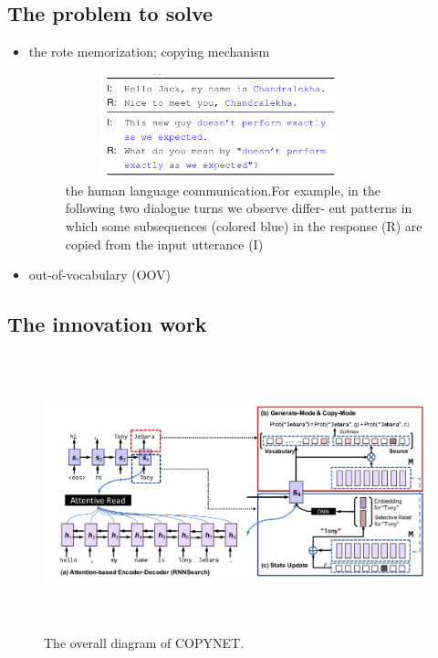 \documentclass[UTF8]{ctexart}
\begin{document}
    \subsection{The problem to solve}
    \begin{itemize}
    \item the rote memorization; copying mechanism

    \begin{figure}[htbp]
        \centering
        \includegraphics[width=9cm,height=3cm]{pictures/lr.jpg}
        \caption{the human language communication.For example, in the
        following two dialogue turns we observe differ-
        ent patterns in which some subsequences (colored
        blue) in the response (R) are copied from the input
        utterance (I)}
      \end{figure}


    \item out-of-vocabulary (OOV) 
    \end{itemize}


    \subsection{The innovation work}

    \begin{figure}[htbp]
        \centering
        \vspace{-0.35cm} 
        \includegraphics[width=14cm,height=8cm]{pictures/model.jpg}
        \caption{The overall diagram of COPYNET.}
    \end{figure}
\end{document}
